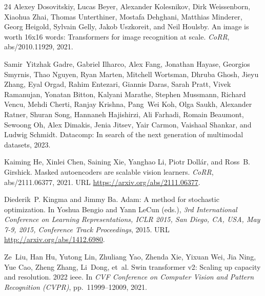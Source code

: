\documentclass[10pt]{article} \usepackage[preprint]{tmlr}
\begin{document}
\begin{thebibliography}{24}
Alexey Dosovitskiy, Lucas Beyer, Alexander Kolesnikov, Dirk Weissenborn,
  Xiaohua Zhai, Thomas Unterthiner, Mostafa Dehghani, Matthias Minderer, Georg
  Heigold, Sylvain Gelly, Jakob Uszkoreit, and Neil Houlsby.
\newblock An image is worth 16x16 words: Transformers for image recognition at
  scale.
\newblock \emph{CoRR}, abs/2010.11929, 2021.

Samir~Yitzhak Gadre, Gabriel Ilharco, Alex Fang, Jonathan Hayase, Georgios
  Smyrnis, Thao Nguyen, Ryan Marten, Mitchell Wortsman, Dhruba Ghosh, Jieyu
  Zhang, Eyal Orgad, Rahim Entezari, Giannis Daras, Sarah Pratt, Vivek
  Ramanujan, Yonatan Bitton, Kalyani Marathe, Stephen Mussmann, Richard Vencu,
  Mehdi Cherti, Ranjay Krishna, Pang~Wei Koh, Olga Saukh, Alexander Ratner,
  Shuran Song, Hannaneh Hajishirzi, Ali Farhadi, Romain Beaumont, Sewoong Oh,
  Alex Dimakis, Jenia Jitsev, Yair Carmon, Vaishaal Shankar, and Ludwig
  Schmidt.
\newblock Datacomp: In search of the next generation of multimodal datasets,
  2023.

Kaiming He, Xinlei Chen, Saining Xie, Yanghao Li, Piotr Doll{\'a}r, and Ross~B.
  Girshick.
\newblock Masked autoencoders are scalable vision learners.
\newblock \emph{CoRR}, abs/2111.06377, 2021.
\newblock URL \url{https://arxiv.org/abs/2111.06377}.

Diederik~P. Kingma and Jimmy Ba.
\newblock Adam: {A} method for stochastic optimization.
\newblock In Yoshua Bengio and Yann LeCun (eds.), \emph{3rd International
  Conference on Learning Representations, {ICLR} 2015, San Diego, CA, USA, May
  7-9, 2015, Conference Track Proceedings}, 2015.
\newblock URL \url{http://arxiv.org/abs/1412.6980}.

Ze~Liu, Han Hu, Yutong Lin, Zhuliang Yao, Zhenda Xie, Yixuan Wei, Jia Ning, Yue
  Cao, Zheng Zhang, Li~Dong, et~al.
\newblock Swin transformer v2: Scaling up capacity and resolution. 2022 ieee.
\newblock In \emph{CVF Conference on Computer Vision and Pattern Recognition
  (CVPR)}, pp.\  11999--12009, 2021.


\end{thebibliography}
\end{document}
